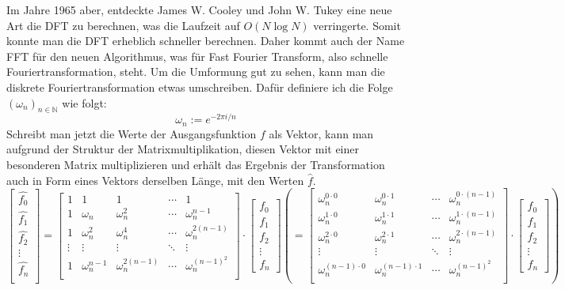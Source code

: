 \documentclass[a4paper,12pt]{article}
\theoremstyle{definition}
\theoremstyle{remark}
\begin{document}
Im Jahre 1965 aber, entdeckte James W. Cooley und John W. Tukey eine neue Art die DFT zu 
berechnen, was die Laufzeit auf $O(N\log N)$ verringerte. Somit konnte man die DFT erheblich 
schneller berechnen. Daher kommt auch der Name FFT für den neuen Algorithmus, was für Fast Fourier 
Transform, also schnelle Fouriertransformation, steht. Um die Umformung gut zu sehen, kann man die 
diskrete Fouriertransformation etwas umschreiben. Dafür definiere ich die Folge $(\omega_n)_{n\in\mathbb{N}}$ 
wie folgt:
$$\omega_n := e^{-2\pi i /n}$$
Schreibt man jetzt die Werte der Ausgangsfunktion $f$ als Vektor, kann man aufgrund der Struktur 
der Matrixmultiplikation, diesen Vektor mit einer besonderen Matrix multiplizieren und erhält das 
Ergebnis der Transformation auch in Form eines Vektors derselben Länge, mit den Werten $\hat{f}$. 
\[
\begin{bmatrix}
\hat{f_0}\\
\hat{f_1}\\
\hat{f_2}\\
\vdots \\
\hat{f_n}\\
\end{bmatrix}
=
\begin{bmatrix}
1 & 1 & 1 & \cdots & 1\\
1 & \omega_n & \omega_n^2 & \cdots & \omega_n^{n-1} \\
1 & \omega_n^2 & \omega_n^4 & \cdots & \omega_n^{2(n-1)}\\
\vdots & \vdots & \vdots & \ddots & \vdots \\
1 & \omega_n^{n-1} & \omega_n^{2(n-1)} & \cdots & \omega_n^{(n-1)^2}\\
\end{bmatrix}
 \cdot
\begin{bmatrix}
f_0\\
f_1\\
f_2\\
\vdots\\
f_n
\end{bmatrix}
\left(
= 
\begin{bmatrix}
\omega_n^{0 \cdot 0} & \omega_n^{0 \cdot 1} & \cdots & \omega_n^{0 \cdot (n-1)}\\
\omega_n^{1 \cdot 0} & \omega_n^{1 \cdot 1} &  \cdots & \omega_n^{1 \cdot (n-1)} \\
\omega_n^{2 \cdot 0} & \omega_n^{2 \cdot 1} &  \cdots & \omega_n^{2 \cdot (n-1)}\\
\vdots & \vdots & \ddots & \vdots \\
\omega_n^{(n-1) \cdot 0} & \omega_n^{(n-1) \cdot 1} & \cdots & \omega_n^{(n-1)^2}\\
\end{bmatrix}
\cdot
\begin{bmatrix}
f_0\\
f_1\\
f_2\\
\vdots\\
f_n
\end{bmatrix}
\right)
\]
\end{document}
